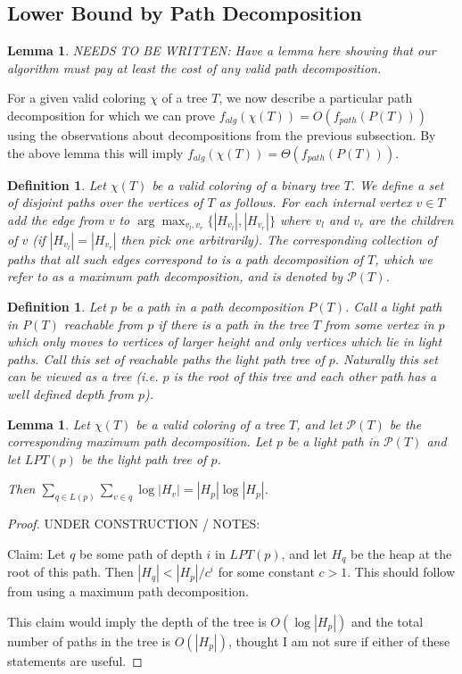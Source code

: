 \documentclass[11pt]{article}
\newtheorem{lemma}[theorem]{Lemma}
\newtheorem{definition}[theorem]{Definition}
\theoremstyle{definition}
\begin{document}
\subsection{Lower Bound by Path Decomposition}

\begin{lemma}
\label{lem:pathDecomp}
NEEDS TO BE WRITTEN:
Have a lemma here showing that our algorithm must pay at least the cost of any valid path decomposition.
\end{lemma}

For a given valid coloring $\chi$ of a tree $T$, we now describe a particular path decomposition for which 
we can prove $f_{alg}(\chi(T)) = O(f_{path}(P(T)))$ using the observations about decompositions from the 
previous subsection.  By the above lemma this will imply $f_{alg}(\chi(T)) = \Theta(f_{path}(P(T)))$.

\begin{definition}
 Let $\chi(T)$ be a valid coloring of a binary tree $T$.  We define a set of disjoint paths over the vertices of 
 $T$ as follows.  For each internal vertex $v\in T$ add the edge from $v$ to $\arg \max_{v_l, v_r} \{|H_{v_l}|, |H_{v_r}|\}$ 
 where $v_l$ and $v_r$ are the children of $v$ (if $|H_{v_l}|=|H_{v_r}|$ then pick one arbitrarily).
 The corresponding collection of paths that all such edges correspond to is a path decomposition of $T$, which 
 we refer to as a \emph{maximum} path decomposition, and is denoted by $\mathcal{P}(T)$.  
\end{definition}

\begin{definition}
 Let $p$ be a path in a path decomposition $P(T)$.  Call a light path in $P(T)$ reachable from $p$ if there is a path in the tree
 $T$ from some vertex in $p$ which only moves to vertices of larger height and only vertices which lie in light paths.
 Call this set of reachable paths the \emph{light path tree} of $p$.  Naturally this set can be viewed as a tree 
 (i.e. $p$ is the root of this tree and each other path has a well defined depth from $p$).
\end{definition}

\begin{lemma}
 Let $\chi(T)$ be a valid coloring of a tree $T$, and let $\mathcal{P}(T)$ be the corresponding maximum path decomposition.
 Let $p$ be a light path in $\mathcal{P}(T)$ and let $LPT(p)$ be the light path tree of $p$.
 
 Then $\sum_{q\in L(p)} \sum_{v\in q} \log |H_v| = |H_p|\log |H_p|$.
\end{lemma}
\begin{proof}UNDER CONSTRUCTION / NOTES:

 Claim: Let $q$ be some path of depth $i$ in $LPT(p)$, and let $H_q$ be the heap at the root of this path.
 Then $|H_q|< |H_p|/c^i$ for some constant $c>1$.  This should follow from using a maximum path decomposition.
 
 This claim would imply the depth of the tree is $O(\log |H_p|)$ and the total number of paths in the tree is $O(|H_p|)$, 
 thought I am not sure if either of these statements are useful.
\end{proof}
\end{document}
